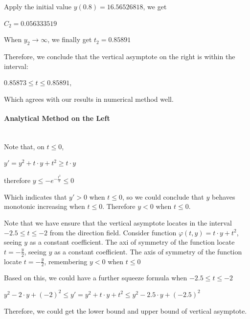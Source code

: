 \documentclass[11pt,a4paper]{article}
\begin{document}
\begin{multicols}{2}
	\noindent Apply the initial value $y(0.8) = 16.56526818$, we get 

	\begin{center}
		$C_2=0.056333519$
	\end{center}

	\noindent When $y_2 \rightarrow \infty$, we finally get $t_2=0.85891$

	\noindent Therefore, we conclude that the vertical asymptote on the right is within the interval:
	\begin{center}
		$0.85873 \leq t \leq 0.85891$,
	\end{center}
	\noindent Which agrees with our results in numerical method well.

	\vfill\null
	\columnbreak

	\paragraph{\small Analytical Method on the Left} 

	~\\
	
	\noindent Note that, on $t \leq 0$,

	\begin{center}
		$y'=y^2+t \cdot y+t^2 \geq t \cdot y$

		therefore $y \leq -e^{-\frac{t^2}{2}} \leq 0$
	\end{center}
	\noindent Which indicates that $y' > 0$ when $t \leq 0$, so we could conclude that $y$ behaves monotonic increasing when $t \leq 0$. Therefore $y < 0$ when $t \leq 0$.

	\noindent Note that we have ensure that the vertical asymptote locates in the interval $-2.5 \leq t \leq -2$ from the direction field. Consider function $\varphi(t,y) = t \cdot y+t^2$, seeing $y$ as a constant coefficient. The axi of symmetry of the function locate $t=-\frac{y}{2}$, seeing $y$ as a constant coefficient. The axis of symmetry of the function locate $t= - \frac{y}{2}$, remembering $y<0$ when $t \leq 0$

	\noindent Based on this, we could have a further squeeze formula when $-2.5 \leq t \leq -2$

	\begin{center}
		$y^2-2 \cdot y+(-2)^2 \leq y' = y^2 + t \cdot y + t^2 \leq y^2 - 2.5 \cdot y + (-2.5)^2$
	\end{center}

	\noindent Therefore, we could get the lower bound and upper bound of vertical asymptote.


\end{multicols}
\end{document}
